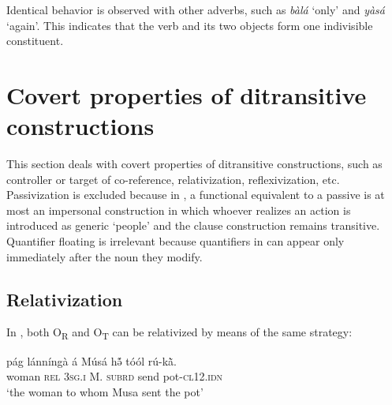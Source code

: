 \documentclass[output=paper]{langsci/langscibook}
\begin{document}
\z

\z

Identical behavior is observed with other adverbs, such as \textit{bàlá} `only' and \textit{yàsá} `again'. This indicates that the verb and its two objects form one indivisible constituent.

\section{Covert properties of ditransitive constructions}\label{§5:covert.pacchiarotti}

This section deals with covert properties of ditransitive constructions, such as controller or target of co-reference, relativization, reflexivization, etc. Passivization is excluded because in , a functional equivalent to a passive is at most an impersonal construction in which whoever realizes an action is introduced as generic `people' and the clause construction remains transitive. Quantifier floating is irrelevant because quantifiers in  can appear only immediately after the noun they modify. 

\subsection{Relativization}\label{§5.1:relativization.pacchiarotti}

In , both O\textsubscript{R}  and O\textsubscript{T}  can be relativized by means of the same strategy:

\ea
\label{ex:33.pacchiarotti}
\gll pág    lánníngà  á    Músá  hə̃́    tóól  rú-k\`{ã}.\\
woman  \textsc{rel}    \textsc{3sg.i}    M.  \textsc{subrd}    send  pot-\textsc{cl12.idn}\\
\glt `the woman to whom Musa sent the pot'
\z
\end{document}
